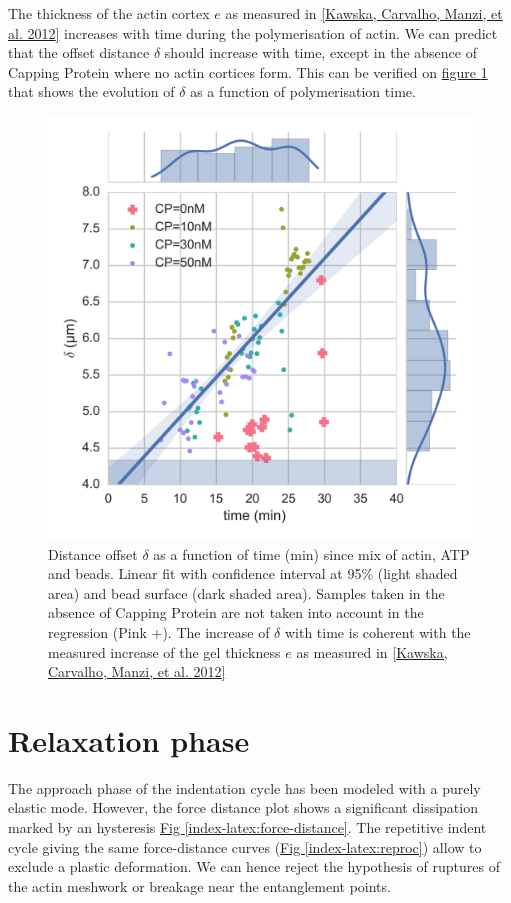 \documentclass[A4paperpaper,11pt,english]{sphinxmanual}
\begin{document}
The thickness of the actin cortex \(e\) as measured in {\hyperref[index-latex:kawska2012]{{[}Kawska, Carvalho, Manzi,  et al.  2012{]}}}
increases with time during the polymerisation of actin. We can predict that the
offset distance \(\delta\) should increase with time, except in the absence of
Capping Protein where no actin cortices form. This can be verified on
\hyperref[index-latex:time-delta-corr]{figure  \ref*{index-latex:time-delta-corr}} that shows the evolution of \(\delta\) as a function
of polymerisation time.
\begin{figure}[htbp]
\centering
\capstart

\includegraphics[width=0.900\linewidth]{time-delta-corr.png}
\caption{Distance offset \(\delta\) as a function of time (min) since mix of actin, ATP
and beads. Linear fit with confidence interval at 95\% (light shaded area)
and bead surface (dark shaded area). Samples taken in the absence of Capping
Protein are not taken into account in the regression (Pink +). The increase
of \(\delta\) with time is coherent with the measured increase of the gel
thickness \(e\) as measured in {\hyperref[index-latex:kawska2012]{{[}Kawska, Carvalho, Manzi,  et al.  2012{]}}}}\label{index-latex:time-delta-corr}\end{figure}


\section{Relaxation phase}
\label{index-latex:id29}
The approach phase of the indentation cycle has been modeled with a purely
elastic mode. However, the force distance plot shows a significant dissipation
marked by an hysteresis \hyperref[index-latex:force-distance]{Fig  \ref*{index-latex:force-distance}}. The repetitive indent cycle giving the same
force-distance curves (\hyperref[index-latex:reproc]{Fig  \ref*{index-latex:reproc}}) allow to exclude a plastic deformation.
We can hence reject the hypothesis of ruptures of the
actin meshwork or breakage near the entanglement points.
\end{document}

